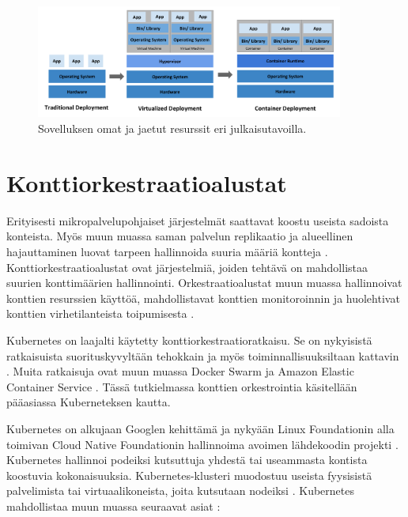 \pagebreak %

\begin{figure}[ht]
\begin{center}
\includegraphics[width=0.9\textwidth]{figures/container_evolution.png}
\caption{Sovelluksen omat ja jaetut resurssit eri julkaisutavoilla.\cite{Kubernetes23}\label{fig:container}}
\end{center}
\end{figure}

\section{Konttiorkestraatioalustat\label{platforms}}

Erityisesti mikropalvelupohjaiset järjestelmät saattavat koostu useista sadoista konteista.
Myös muun muassa saman palvelun replikaatio ja alueellinen hajauttaminen luovat tarpeen hallinnoida suuria määriä kontteja \cite{Khan17}.
Konttiorkestraatioalustat ovat järjestelmiä, joiden tehtävä on mahdollistaa suurien konttimäärien hallinnointi.
Orkestraatioalustat muun muassa hallinnoivat konttien resurssien käyttöä, mahdollistavat konttien monitoroinnin ja huolehtivat konttien virhetilanteista toipumisesta \cite{Zhou21}.

Kubernetes on laajalti käytetty konttiorkestraatioratkaisu.
Se on nykyisistä ratkaisuista suorituskyvyltään tehokkain ja myös toiminnallisuuksiltaan kattavin \cite{Jawarneh19}.
Muita ratkaisuja ovat muun muassa Docker Swarm ja Amazon Elastic Container Service \cite{Khan17}.
Tässä tutkielmassa konttien orkestrointia käsitellään pääasiassa Kuberneteksen kautta.

Kubernetes on alkujaan Googlen kehittämä ja nykyään Linux Foundationin alla toimivan Cloud Native Foundationin hallinnoima avoimen lähdekoodin projekti \cite{Burns22}.
Kubernetes hallinnoi podeiksi kutsuttuja yhdestä tai useammasta kontista koostuvia kokonaisuuksia.
Kubernetes-klusteri muodostuu useista fyysisistä palvelimista tai virtuaalikoneista, joita kutsutaan nodeiksi \cite{Medel18}.
Kubernetes mahdollistaa muun muassa seuraavat asiat \cite{Zhou21}:

